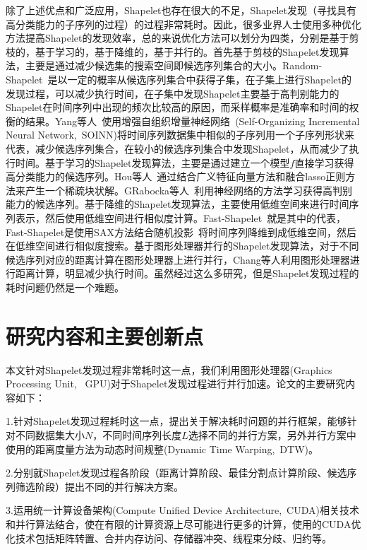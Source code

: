 除了上述优点和广泛应用，Shapelet也存在很大的不足，Shapelet发现（寻找具有高分类能力的子序列的过程）的过程非常耗时。因此，很多业界人士使用多种优化方法提高Shapelet的发现效率，总的来说优化方法可以划分为四类，分别是基于剪枝的，基于学习的，基于降维的，基于并行的。首先基于剪枝的Shapelet发现算法，主要是通过减少候选集的搜索空间即候选序列集合的大小。Random-Shapelet~\cite{renard2015random}是以一定的概率从候选序列集合中获得子集，在子集上进行Shapelet的发现过程，可以减少执行时间，在子集中发现Shapelet主要基于高判别能力的Shapelet在时间序列中出现的频次比较高的原因，而采样概率是准确率和时间的权衡的结果。Yang等人~\cite{yang2016shapelet}使用增强自组织增量神经网络~\cite{furao2007enhanced}(Self-Organizing Incremental Neural Network,~SOINN)将时间序列数据集中相似的子序列用一个子序列形状来代表，减少候选序列集合，在较小的候选序列集合中发现Shapelet，从而减少了执行时间。基于学习的Shapelet发现算法，主要是通过建立一个模型$f$直接学习获得高分类能力的候选序列。Hou等人~\cite{hou2016efficient}通过结合广义特征向量方法和融合lasso正则方法来产生一个稀疏块状解。GRabocka等人~\cite{grabocka2014learning}利用神经网络的方法学习获得高判别能力的候选序列。基于降维的Shapelet发现算法，主要使用低维空间来进行时间序列表示，然后使用低维空间进行相似度计算。Fast-Shapelet~\cite{rakthanmanon2013fast}就是其中的代表，Fast-Shapelet是使用SAX方法结合随机投影~\cite{lin2007experiencing}将时间序列降维到成低维空间，然后在低维空间进行相似度搜索。基于图形处理器并行的Shapelet发现算法，对于不同候选序列对应的距离计算在图形处理器上进行并行，Chang等人\cite{chang2012efficient}利用图形处理器进行距离计算，明显减少执行时间。虽然经过这么多研究，但是Shapelet发现过程的耗时问题仍然是一个难题。

\section{研究内容和主要创新点}

本文针对Shapelet发现过程非常耗时这一点，我们利用图形处理器(Graphics Processing Unit, ~GPU)对于Shapelet发现过程进行并行加速。论文的主要研究内容如下：

1.针对Shapelet发现过程耗时这一点，提出关于解决耗时问题的并行框架，能够针对不同数据集大小$N$，不同时间序列长度$L$选择不同的并行方案，另外并行方案中使用的距离度量方法为动态时间规整(Dynamic Time Warping,~DTW)。

2.分别就Shapelet发现过程各阶段（距离计算阶段、最佳分割点计算阶段、候选序列筛选阶段）提出不同的并行解决方案。

3.运用统一计算设备架构(Compute Unified Device Architecture,~CUDA)相关技术和并行算法结合，使在有限的计算资源上尽可能进行更多的计算，使用的CUDA优化技术包括矩阵转置、合并内存访问、存储器冲突、线程束分歧、归约等。

